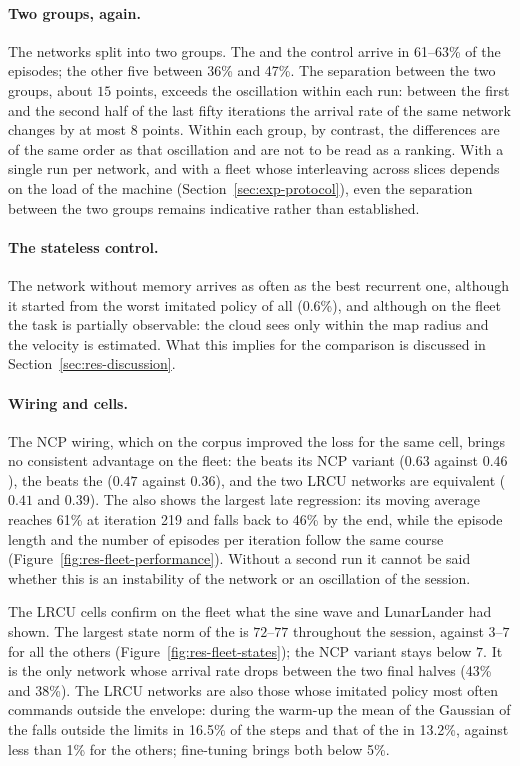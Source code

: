 \paragraph{Two groups, again.}
The networks split into two groups. The  and the control
arrive in 61--63\% of the episodes; the other five between 36\% and 47\%. The
separation between the two groups, about $15$ points, exceeds the oscillation
within each run: between the first and the second half of the last fifty
iterations the arrival rate of the same network changes by at most $8$ points.
Within each group, by contrast, the differences are of the same order as that
oscillation and are not to be read as a ranking. With a single run per network,
and with a fleet whose interleaving across slices depends on the load of the
machine (Section~\ref{sec:exp-protocol}), even the separation between the two
groups remains indicative rather than established.

\paragraph{The stateless control.}
The network without memory arrives as often as the best recurrent one, although
it started from the worst imitated policy of all (0.6\%), and although on the
fleet the task is partially observable: the cloud sees only within the map
radius and the velocity is estimated. What this implies for the comparison is
discussed in Section~\ref{sec:res-discussion}.

\paragraph{Wiring and cells.}
The NCP wiring, which on the corpus improved the loss for the same cell, brings
no consistent advantage on the fleet: the  beats its NCP
variant ($0.63$ against $0.46$), the  beats the
 ($0.47$ against $0.36$), and the two LRCU networks are
equivalent ($0.41$ and $0.39$). The  also shows the
largest late regression: its moving average reaches 61\% at iteration \num{219}
and falls back to 46\% by the end, while the episode length and the number of
episodes per iteration follow the same course
(Figure~\ref{fig:res-fleet-performance}). Without a second run it cannot be
said whether this is an instability of the network or an oscillation of the
session.

The LRCU cells confirm on the fleet what the sine wave and LunarLander had
shown. The largest state norm of the  is $72$--$77$
throughout the session, against $3$--$7$ for all the others
(Figure~\ref{fig:res-fleet-states}); the NCP variant stays below $7$. It is the
only network whose arrival rate drops between the two final halves (43\% and
38\%). The LRCU networks are also those whose imitated policy most often
commands outside the envelope: during the warm-up the mean of the Gaussian of
the  falls outside the limits in 16.5\% of the steps
and that of the  in 13.2\%, against less than 1\% for the
others; fine-tuning brings both below 5\%.

